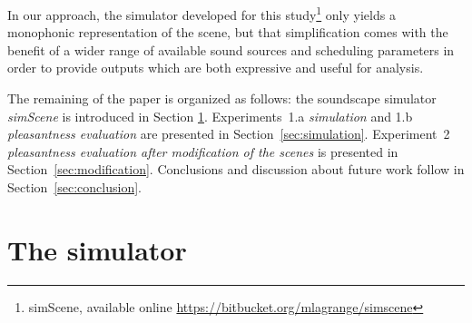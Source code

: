 \documentclass[12pt]{elsarticle}
\newcommand{\cf}{cf.}
\begin{document}
In our approach, the simulator developed for this study\footnote{simScene, available online \url{https://bitbucket.org/mlagrange/simscene}} only yields a monophonic representation of the scene, but that simplification comes with the benefit of a wider range of available sound sources and scheduling parameters in order to provide outputs which are both expressive and useful for analysis.


The remaining of the paper is organized as follows: the soundscape simulator \emph{simScene} is introduced in Section \ref{sec:simulator}. Experiments~1.a \emph{simulation} and  1.b \emph{pleasantness evaluation} are presented in Section~\ref{sec:simulation}. Experiment~2 \emph{pleasantness evaluation after modification of the scenes} is presented in Section~\ref{sec:modification}. Conclusions and discussion about future work follow in Section~\ref{sec:conclusion}.






\section{The simulator}
\label{sec:simulator}

\end{document}
